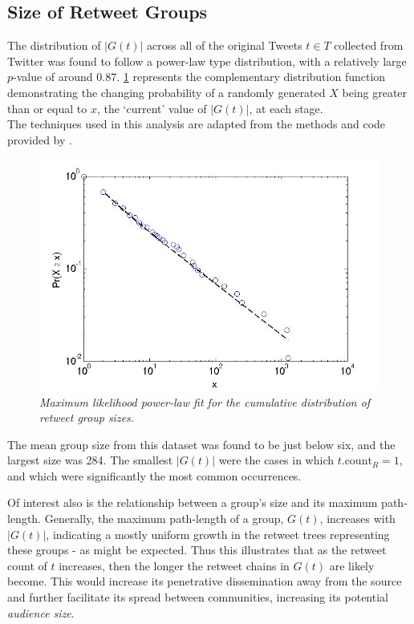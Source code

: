 \subsection{Size of Retweet Groups}
The distribution of $|G(t)|$ across all of the original Tweets $t \in T$ collected from Twitter was found to follow a power-law type distribution, with a relatively large $p$-value of around $0.87$. \ref{fig:retweet-distribution} represents the complementary distribution function demonstrating the changing probability of a randomly generated $X$ being greater than or equal to $x$, the `current' value of $|G(t)|$, at each stage.\\
The techniques used in this analysis are adapted from the methods and code provided by \cite{clauset07}.

\begin{figure}[h]
\centering
\includegraphics[scale=0.35]{3.Chapter1/Media/retweets-distribution-stats.jpg} 
\caption{\textit{Maximum likelihood power-law fit for the cumulative distribution of retweet group sizes.}}
\label{fig:retweet-distribution}
\end{figure}

The mean group size from this dataset was found to be just below six, and the largest size was 284. The smallest $|G(t)|$ were the cases in which $t.\textrm{count}_R = 1$, and which were significantly the most common occurrences.

Of interest also is the relationship between a group's size and its maximum path-length. Generally, the maximum path-length of a group, $G(t)$, increases with $|G(t)|$, indicating a mostly uniform growth in the retweet trees representing these groups - as might be expected. Thus this illustrates that as the retweet count of $t$ increases, then the longer the retweet chains in $G(t)$ are likely become. This would increase its penetrative dissemination away from the source and further facilitate its spread between communities, increasing its potential \textit{audience size}.

